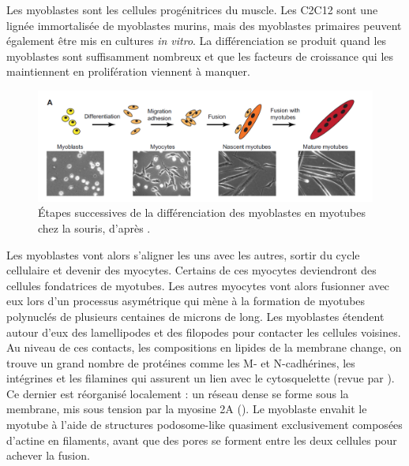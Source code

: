 Les myoblastes sont les cellules progénitrices du muscle. Les C2C12 sont une lignée immortalisée de myoblastes murins, mais des myoblastes primaires peuvent également être mis en cultures \textit{in vitro}.
La différenciation se produit quand les myoblastes sont suffisamment nombreux et que les facteurs de croissance qui les maintiennent en prolifération viennent à manquer. 
\begin{figure}
\includegraphics[scale=0.4]{Figures/Myoblast_fusion.png} 
\caption{\'Etapes successives de la différenciation des myoblastes en myotubes chez la souris, d'après \cite{abmayr_myoblast_2012}. }
\end{figure}

Les myoblastes vont alors s'aligner les uns avec les autres, sortir du cycle cellulaire et devenir des myocytes. Certains de ces myocytes deviendront des cellules fondatrices de myotubes. Les autres myocytes vont alors fusionner avec eux lors d'un processus asymétrique qui mène à la formation de myotubes polynuclés de plusieurs centaines de microns de long. 
Les myoblastes étendent autour d'eux des lamellipodes et des filopodes pour contacter les cellules voisines. Au niveau de ces contacts, les compositions en lipides de la membrane change, on trouve un grand nombre de protéines comme les M- et N-cadhérines, les intégrines et les filamines qui assurent un lien avec le cytosquelette (revue par \cite{abmayr_myoblast_2012}). Ce dernier est réorganisé localement : un réseau dense se forme sous la membrane, mis sous tension par la myosine 2A (\cite{duan_dependence_2009}). 
Le myoblaste envahit le myotube à l'aide de structures podosome-like quasiment exclusivement composées d'actine en filaments, avant que des pores se forment entre les deux cellules pour achever la fusion. 


